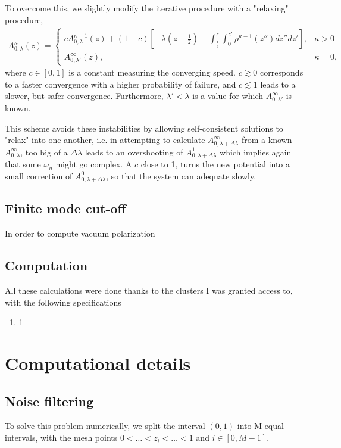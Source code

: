 To overcome this, we slightly modify the iterative procedure with a "relaxing" procedure, 
\begin{align}
	A_{0,\lambda}^{\kappa}(z) = 
\begin{cases}
    c A_{0, \lambda}^{\kappa-1}(z)+ (1-c) \left[ -\lambda \left( z-\frac{1}{2} \right) - \int_{\frac{1}{2}}^{z} \int_{0}^{z'} \rho^{\kappa-1} (z'') dz'' dz'   \right],& \kappa>0\\
	A_{0,\lambda'}^{\infty}(z) , &\kappa = 0,
\end{cases}\end{align}
where $c\in [0, 1]$ is a constant measuring the converging speed. $c\gtrsim 0$ corresponds to a faster convergence with a higher probability of failure, and $c\lesssim 1$ leads to a slower, but safer convergence.
Furthermore, $\lambda'<\lambda$ is a value for which $A_{0, \lambda'}^\infty$ is known.

This scheme avoids these instabilities by allowing self-consistent solutions to "relax" into one another, i.e. in attempting to calculate $A_{0, \lambda + \Delta \lambda}^\infty$ from a known $A_{0, \lambda}^\infty$, too big of a $\Delta \lambda$ leads to an overshooting of $A_{0, \lambda+\Delta \lambda}^1$ which implies again that some $\omega_n$ might go complex. A $c$ close to 1, turns the new potential into a small correction of $A_{0,\lambda+\Delta\lambda}^0$, so that the system can adequate slowly.

\subsection{Finite mode cut-off}

In order to compute vacuum polarization 

\subsection{Computation}
All these calculations were done thanks to the clusters I was granted access to, with the following specifications 
\begin{enumerate}
    \item 1
\end{enumerate}

\section{Computational details}

\subsection{Noise filtering}
To solve this problem numerically, we split the interval $(0, 1)$ into M equal intervals, with the mesh points $0<\ldots<z_i<\ldots<1$ and  $i\in \left[ 0, M-1 \right] $.


